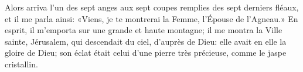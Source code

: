 Alors arriva l’un des sept anges aux sept coupes
		remplies des sept derniers fléaux,
	et il me parla ainsi:
	«Viens, je te montrerai la Femme, l’Épouse de l’Agneau.»
En esprit, il m’emporta sur une grande et haute montagne;
	il me montra la Ville sainte, Jérusalem,
	qui descendait du ciel, d’auprès de Dieu:
	elle avait en elle la gloire de Dieu;
	son éclat était celui d’une pierre très précieuse,
		comme le jaspe cristallin.

